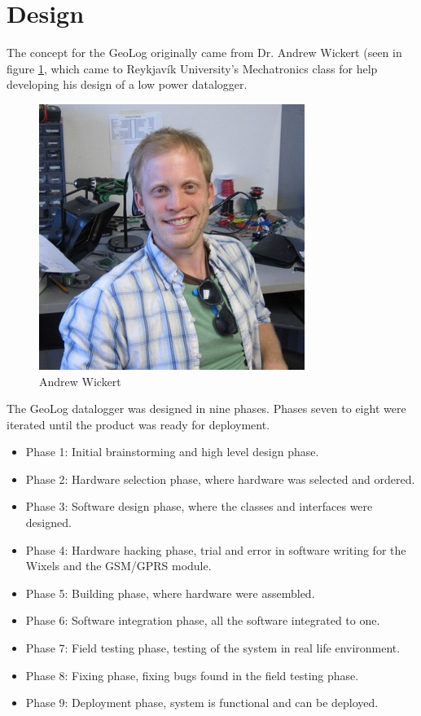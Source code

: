 \section{Design}
The concept for the GeoLog originally came from Dr. Andrew Wickert (seen in figure 
\ref{fig:andrewWickert},
which came to Reykjavík University's Mechatronics class for help developing his 
design of a low power datalogger\cite{ALog-BottleLogger}. 

\begin{figure}
\centering
\includegraphics[width=0.6\linewidth]{graphics/andrewWickert}
\caption{Andrew Wickert\label{fig:andrewWickert}\cite{andrewWickert}}
\end{figure}

The GeoLog datalogger was designed in nine phases. Phases seven to eight were iterated
until the product was ready for deployment.
\begin{itemize}
	\item{Phase 1:} Initial brainstorming and high level design phase.
	\item{Phase 2:} Hardware selection phase, where hardware was selected and ordered.
	\item{Phase 3:} Software design phase, where the classes and interfaces were designed.
	\item{Phase 4:} Hardware hacking phase, trial and error in software writing for the
					Wixels\cite{wixel} and the GSM/GPRS module\cite{SM5100B}.
	\item{Phase 5:} Building phase, where hardware were assembled.
	\item{Phase 6:} Software integration phase, all the software integrated to one.
	\item{Phase 7:} Field testing phase, testing of the system in real life environment.
	\item{Phase 8:} Fixing phase, fixing bugs found in the field testing phase.
	\item{Phase 9:} Deployment phase, system is functional and can be deployed. 
\end{itemize}



